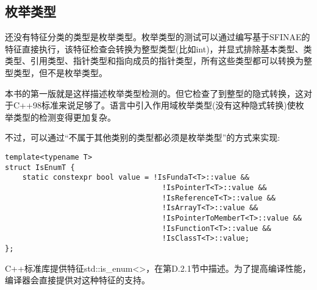\subsection{枚举类型}

还没有特征分类的类型是枚举类型。枚举类型的测试可以通过编写基于SFINAE的特征直接执行，该特征检查会转换为整型类型(比如int)，并显式排除基本类型、类类型、引用类型、指针类型和指向成员的指针类型，所有这些类型都可以转换为整型类型，但不是枚举类型。

\begin{tcolorbox}[colback=webgreen!5!white,colframe=webgreen!75!black]
\hspace*{0.75cm}本书的第一版就是这样描述枚举类型检测的。但它检查了到整型的隐式转换，这对于C++98标准来说足够了。语言中引入作用域枚举类型(没有这种隐式转换)使枚举类型的检测变得更加复杂。
\end{tcolorbox}

不过，可以通过“不属于其他类别的类型都必须是枚举类型”的方式来实现:

\begin{lstlisting}[style=styleCXX]
template<typename T>
struct IsEnumT {
	static constexpr bool value = !IsFundaT<T>::value &&
									!IsPointerT<T>::value &&
									!IsReferenceT<T>::value &&
									!IsArrayT<T>::value &&
									!IsPointerToMemberT<T>::value &&
									!IsFunctionT<T>::value &&
									!IsClassT<T>::value;
};
\end{lstlisting}

C++标准库提供特征std::is\_enum<>，在第D.2.1节中描述。为了提高编译性能，编译器会直接提供对这种特征的支持。














